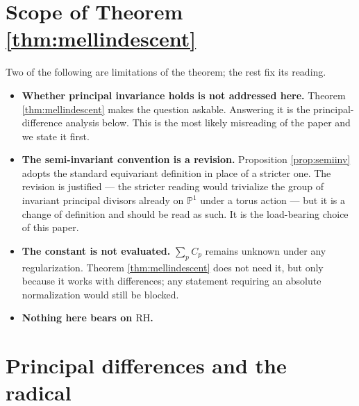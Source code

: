 \documentclass[11pt]{amsart}
\theoremstyle{definition}
\theoremstyle{remark}
\newcommand{\RH}{\mathrm{RH}}
\begin{document}
\section{Scope of Theorem \ref{thm:mellindescent}}

Two of the following are limitations of the theorem; the rest fix its
reading.

\begin{itemize}
\item \textbf{Whether principal invariance holds is not addressed here.}
Theorem \ref{thm:mellindescent} makes the question askable.  Answering it is
the principal-difference analysis below.  This is the most likely misreading of the paper and we state it
first.

\item \textbf{The semi-invariant convention is a revision.}  Proposition
\ref{prop:semiinv} adopts the standard equivariant definition in place of a
stricter one.  The revision is justified --- the stricter reading would
trivialize the group of invariant principal divisors already on
$\mathbb P^1$ under a torus action --- but it is a change of definition and
should be read as such.  It is the load-bearing choice of this paper.

\item \textbf{The constant is not evaluated.}  $\sum_pC_p$ remains unknown
under any regularization.  Theorem \ref{thm:mellindescent} does not need it, but
only because it works with differences; any statement requiring an absolute
normalization would still be blocked.

\item \textbf{Nothing here bears on $\RH$.}
\end{itemize}

\section{Principal differences and the radical}
\end{document}
